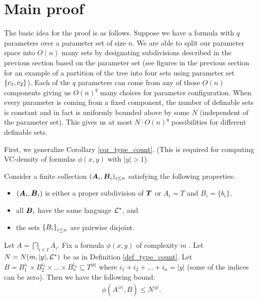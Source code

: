 \section{Main proof}
The basic idea for the proof is as follows.
Suppose we have a formula with $q$ parameters over a parameter set of size $n$.
We are able to split our parameter space into $O(n)$ many sets
by designating subdivisions described in the previous section based on the parameter set
(see figures in the previous section for an example of a partition of the tree into four sets using parameter set $\left\{c_1, c_2\right\}$).
Each of the $q$ parameters can come from any of those $O(n)$ components giving us $O(n)^q$ many choices for parameter configuration.
When every parameter is coming from a fixed component, the number of definable sets is constant and in fact is uniformly bounded above by some $N$
(independent of the parameter set).
This gives us at most $N \cdot O(n)^q$ possibilities for different definable sets.

First, we generalize Corollary \ref{cor_type_count}.
(This is required for computing VC-density of formulas $\phi(x, y)$ with $|y| > 1$).

\begin{Lemma} \label{lm_partition_bound}
  Consider a finite collection $(\operatorname{\boldsymbol A}_i, \operatorname{\boldsymbol B}_i)_{i \leq n}$ satisfying the following properties:
  \begin{itemize}
  \item $(\operatorname{\boldsymbol A}_i, \operatorname{\boldsymbol B}_i)$ is either a proper subdivision of $\operatorname{\boldsymbol T}$ or $A_i = T$ and $B_i = \{b_i\}$,
  \item all $\operatorname{\boldsymbol B}_i$ have the same language $\mathcal L^*$, and 
  \item the sets $\left\{B_i\right\}_{i \leq n}$ are pairwise disjoint.
  \end{itemize}
  Let $A = \bigcap_{i \in I} A_i$.
  Fix a formula $\phi(x, y)$ of complexity $m$ . Let $N = N(m, |y|, \mathcal L^*)$ be as in Definition \ref{def_type_count}.
  Let $B = B_1^{i_1} \times B_2^{i_2} \times \ldots \times B_n^{i_n} \subseteq T^{|y|}$ where $i_1 + i_2 + \ldots + i_n = |y|$
  (some of the indices can be zero). Then we have the following bound:
  \begin{align*}
    \phi(A^{|x|}, B) \leq N^{|y|}.
  \end{align*}
\end{Lemma}


